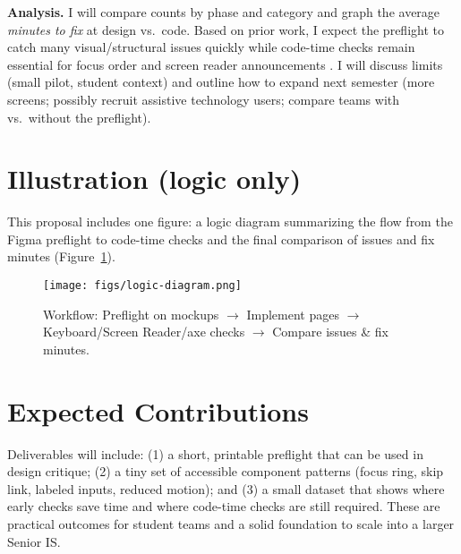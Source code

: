 \documentclass[12pt]{article}
\begin{document}
\textbf{Analysis.} I will compare counts by phase and category and graph the average \emph{minutes to fix} at design vs.\ code. Based on prior work, I expect the preflight to catch many visual/structural issues quickly while code-time checks remain essential for focus order and screen reader announcements \cite{huang2024a11yfigma, chen2024figmaapps, shi2023uxaccesspractice}. I will discuss limits (small pilot, student context) and outline how to expand next semester (more screens; possibly recruit assistive technology users; compare teams with vs.\ without the preflight).

\section*{Illustration (logic only)}
This proposal includes one figure: a logic diagram summarizing the flow from the Figma preflight to code-time checks and the final comparison of issues and fix minutes (Figure~\ref{fig:logic}).

\begin{figure}[h]
  \centering
  \texttt{[image: figs/logic-diagram.png]}
  \caption{Workflow: Preflight on mockups $\rightarrow$ Implement pages $\rightarrow$ Keyboard/Screen Reader/axe checks $\rightarrow$ Compare issues \& fix minutes.}
  \label{fig:logic}
\end{figure}

\section*{Expected Contributions}
Deliverables will include: (1) a short, printable preflight that can be used in design critique; (2) a tiny set of accessible component patterns (focus ring, skip link, labeled inputs, reduced motion); and (3) a small dataset that shows where early checks save time and where code-time checks are still required. These are practical outcomes for student teams and a solid foundation to scale into a larger Senior IS.




\newpage
\end{document}
